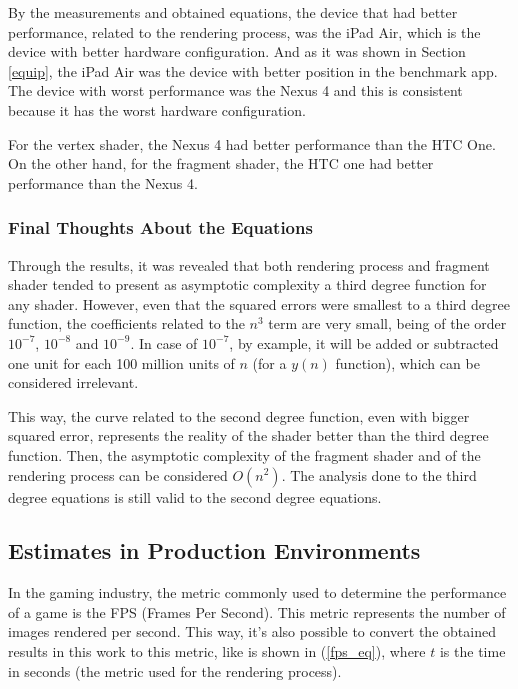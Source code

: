 \documentclass[10pt, conference, compsocconf]{IEEEtran}
\begin{document}
 By the measurements and obtained equations, the device that had better
performance, related to the rendering process, was the iPad Air, which is
the device with better hardware configuration. And as it was shown in 
Section \ref{equip}, the iPad Air was the device with better position in 
the benchmark app. The device with worst performance was the Nexus 4 and 
this is consistent because it has the worst hardware configuration.

For the vertex shader, the Nexus 4 had better performance than the HTC One.
On the other hand, for the fragment shader, the HTC one had better performance
than the Nexus 4.

\subsubsection{Final Thoughts About the Equations}

Through the results, it was revealed that both rendering process and fragment
shader tended to present as asymptotic complexity a third degree function
for any shader. However, even that the squared errors were smallest to a third degree function,
the coefficients related to the $n^3$ term are very small, being of the 
order $10^{-7}$, $10^{-8}$ and $10^{-9}$. In case of $10^{-7}$, by example, it will be added or subtracted one unit
for each 100 million units of $n$ (for a $y(n)$ function), 
which can be considered irrelevant.

 This way, the curve related to the second degree function, even with 
bigger squared error, represents the reality of the shader better than the
third degree function. Then, the asymptotic complexity of the fragment 
shader and of the rendering process can be considered $O(n^2)$. The analysis done to the third degree 
equations is still valid to the second degree equations.

\subsection{Estimates in Production Environments}

In the gaming industry, the metric commonly used to determine the 
performance of a game is the FPS (Frames Per Second). This metric 
represents the number of images rendered per second. This way,
it's also possible to convert the obtained results in this work 
to this metric, like is shown in (\ref{fps_eq}),
where $t$ is the time in seconds (the metric used for the rendering process).
\end{document}
